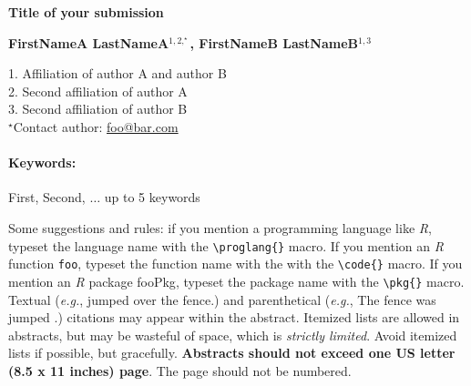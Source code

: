 \documentclass[11pt, a4paper]{article}
\newcommand{\pkg}[1]{{\normalfont\fontseries{b}\selectfont #1}}
\let\proglang=\textit
\let\code=\texttt
\renewcommand{\title}[1]{\begin{center}{\bf \LARGE #1}\end{center}}
\newcommand{\keywords}{\paragraph{Keywords:}}
\begin{document}
\pagestyle{empty}

\title{Title of your submission}

\begin{center}
  {\bf FirstNameA LastNameA$^{1,2,^\star}$, FirstNameB LastNameB$^{1,3}$}
\end{center}

\begin{affiliations}
1. Affiliation of author A and author B \\[-2pt]
2. Second affiliation of author A \\[-2pt]
3. Second affiliation of author B \\[-2pt]
$^\star$Contact author: \href{mailto:foo@bar.com}{foo@bar.com}\\
\end{affiliations}

\keywords First, Second, $\ldots$ up to 5 keywords

\vskip 0.8cm

Some suggestions and rules: if you mention a programming language like \proglang{R}, typeset the language name with the {\tt \textbackslash proglang\{\}} macro. If you mention an \proglang{R} function \code{foo}, typeset the function name with the with the {\tt\textbackslash code\{\}} macro. If you mention an \proglang{R} package \pkg{fooPkg}, typeset the package name with the {\tt\textbackslash pkg\{\}} macro. Textual ({\it e.g.}, \citet{ref1} jumped over the fence.) and parenthetical ({\it e.g.}, The fence was jumped \citep{ref1}.) citations may appear within the abstract. Itemized lists are allowed in abstracts, but may be wasteful of space, which is {\it strictly limited}. Avoid itemized lists if possible, but gracefully. {\bf Abstracts should not exceed one US letter (8.5 x 11 inches) page}. The page should not be numbered. 



\nocite{ref1,ref2,ref3}






\end{document}
